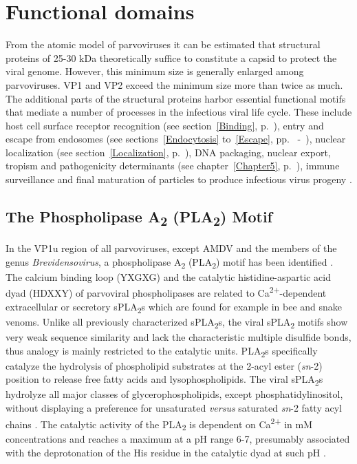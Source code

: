 \section{Functional domains}
\label{Motif}

From the atomic model of parvoviruses it can be estimated that structural proteins of 25-30 kDa theoretically suffice to constitute a capsid to protect the viral genome. However, this minimum size is generally enlarged among parvoviruses. VP1 and VP2 exceed the minimum size more than twice as much. The additional parts of the structural proteins harbor essential functional motifs that mediate a number of processes in the infectious viral life cycle. These include host cell surface receptor recognition (see section~\ref{Binding}, p.~\pageref{Binding}), entry and escape from endosomes (see sections~\ref{Endocytosis} to~\ref{Escape}, pp.~\pageref{Endocytosis} -~\pageref{Escape}), nuclear localization (see section~\ref{Localization}, p.~\pageref{Localization}), DNA packaging, nuclear export, tropism and pathogenicity determinants (see chapter~\ref{Chapter5}, p.~\pageref{Chapter5}), immune surveillance and final maturation of particles to produce infectious virus progeny \cite{PLA2}.    

\subsection{The Phospholipase A\textsubscript{2} (PLA\textsubscript{2}) Motif}
\label{PLA2}

In the VP1u region of all parvoviruses, except AMDV and the members of the genus \textit{Brevidensovirus}, a phospholipase A\textsubscript{2} (PLA\textsubscript{2}) motif has been identified \cite{pmid11702787}. The calcium binding loop (YXGXG) and the catalytic histidine-aspartic acid dyad (HDXXY) of parvoviral phospholipases are related to Ca\textsuperscript{2+}-dependent extracellular or secretory sPLA\textsubscript{2}s which are found for example in bee and snake venoms. Unlike all previously characterized sPLA\textsubscript{2}s, the viral sPLA\textsubscript{2} motifs show very weak sequence similarity and lack the characteristic multiple disulfide bonds, thus analogy is mainly restricted to the catalytic units. PLA\textsubscript{2}s specifically catalyze the hydrolysis of phospholipid substrates at the 2-acyl ester (\textit{sn}-2) position to release free fatty acids and lysophospholipids. The viral sPLA\textsubscript{2}s hydrolyze all major classes of glycerophospholipids, except phosphatidylinositol, without displaying a preference for unsaturated \textit{versus} saturated \textit{sn}-2 fatty acyl chains \cite{pmid14726513}. The catalytic activity of the PLA\textsubscript{2} is dependent on Ca\textsuperscript{2+} in mM concentrations and reaches a maximum at a pH range 6-7, presumably associated with the deprotonation of the His residue in the catalytic dyad at such pH \cite{pmid9115999, pmid7574497}.

